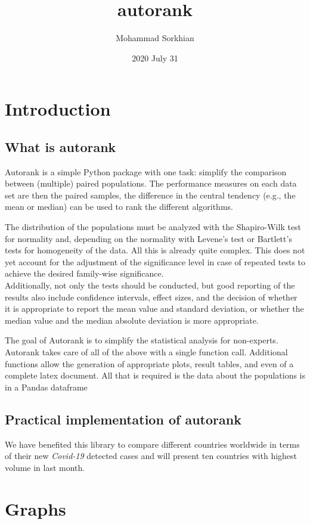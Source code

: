 \documentclass[12pt, letterpaper, twoside]{report}
\title{\textbf{autorank}}
\author{Mohammad Sorkhian}
\date{2020 July 31}
\begin{document}
\maketitle

\chapter{Introduction}
\section{What is \textbf{autorank}}
Autorank is a simple Python package with one task: simplify the comparison between (multiple) paired populations. The performance measures on each data set are then the paired samples, the difference in the central tendency (e.g., the mean or median) can be used to rank the different algorithms.

The distribution of the populations must be analyzed with the Shapiro-Wilk test for normality and, depending on the normality with Levene's test or Bartlett's tests for homogeneity of the data. All this is already quite complex. This does not yet account for the adjustment of the significance level in case of repeated tests to achieve the desired family-wise significance. \\Additionally, not only the tests should be conducted, but good reporting of the results also include confidence intervals, effect sizes, and the decision of whether it is appropriate to report the mean value and standard deviation, or whether the median value and the median absolute deviation is more appropriate.

The goal of Autorank is to simplify the statistical analysis for non-experts. Autorank takes care of all of the above with a single function call. Additional functions allow the generation of appropriate plots, result tables, and even of a complete latex document. All that is required is the data about the populations is in a Pandas dataframe

\section{Practical implementation of \textbf{autorank}}
We have benefited this library to compare different countries worldwide in terms of their new \textit{Covid-19} detected cases and will present ten countries with highest volume in last month.

\chapter{Graphs}
\end{document}
